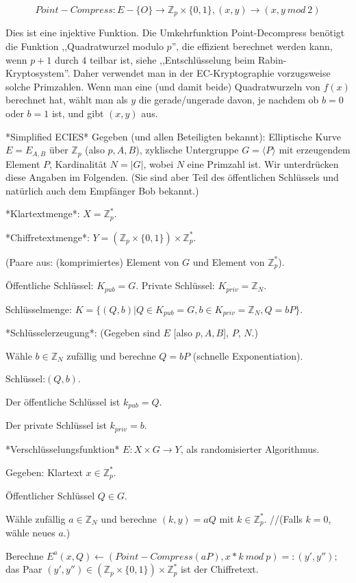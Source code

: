 \documentclass[a4paper]{article}
\begin{document}
\begin{multicols}{3}
    $$Point-Compress: E-\{O\}\rightarrow\mathbb{Z}_p \times\{0,1\},(x,y)\rightarrow (x,y\ mod\ 2)$$

    Dies ist eine injektive Funktion. Die Umkehrfunktion Point-Decompress benötigt die Funktion ,,Quadratwurzel modulo $p$'', die effizient berechnet werden kann, wenn $p+1$ durch $4$ teilbar ist, siehe ,,Entschlüsselung beim Rabin-Kryptosystem''. Daher verwendet man in der EC-Kryptographie vorzugsweise solche Primzahlen. Wenn man eine (und damit beide) Quadratwurzeln von $f(x)$ berechnet hat, wählt man als $y$ die gerade/ungerade davon, je nachdem ob $b=0$ oder $b=1$ ist, und gibt $(x,y)$ aus.

    *Simplified ECIES*
    Gegeben (und allen Beteiligten bekannt): Elliptische Kurve $E=E_{A,B}$ über $\mathbb{Z}_p$ (also $p,A,B$), zyklische Untergruppe $G=\langle P\rangle $ mit erzeugendem Element $P$, Kardinalität $N=|G|$, wobei $N$ eine Primzahl ist. Wir unterdrücken diese Angaben im Folgenden.
    (Sie sind aber Teil des öffentlichen Schlüssels und natürlich auch dem Empfänger Bob bekannt.)

    *Klartextmenge*: $X=\mathbb{Z}^*_p$.

    *Chiffretextmenge*: $Y=(\mathbb{Z}_p \times\{0,1\})\times\mathbb{Z}^*_p$.
    \begin{itemize*}
        \item (Paare aus: (komprimiertes) Element von $G$ und Element von $\mathbb{Z}^*_p$).
        \item Öffentliche Schlüssel: $K_{pub}=G$. Private Schlüssel: $K_{priv}=\mathbb{Z}_N$.
        \item Schlüsselmenge: $K=\{(Q,b)|Q\in K_{pub} = G,b\in K_{priv} =\mathbb{Z}_N,Q=bP\}$.
    \end{itemize*}

    *Schlüsselerzeugung*: (Gegeben sind $E$ [also $p,A,B$], $P$, $N$.)
    \begin{itemize*}
        \item Wähle $b\in\mathbb{Z}_N$ zufällig und berechne $Q=bP$ (schnelle Exponentiation).
        \item Schlüssel:$(Q,b)$.
        \item Der öffentliche Schlüssel ist $k_{pub}=Q$.
        \item Der private Schlüssel ist $k_{priv}=b$.
    \end{itemize*}

    *Verschlüsselungsfunktion* $E:X\times G\rightarrow Y$, als randomisierter Algorithmus.
    \begin{itemize*}
        \item Gegeben: Klartext $x\in\mathbb{Z}^*_p$.
        \item Öffentlicher Schlüssel $Q\in G$.
        \item Wähle zufällig $a\in\mathbb{Z}_N$ und berechne $(k,y) =aQ$ mit $k\in\mathbb{Z}^*_p$. //(Falls $k=0$, wähle neues $a$.)
        \item Berechne $E^a (x,Q)\leftarrow (Point-Compress(aP),x*k\ mod\ p) =: (y',y'');$ das Paar $(y',y'')\in(\mathbb{Z}_p\times\{0,1\})\times\mathbb{Z}^*_p$ ist der Chiffretext.
    \end{itemize*}


\end{multicols}
\end{document}
